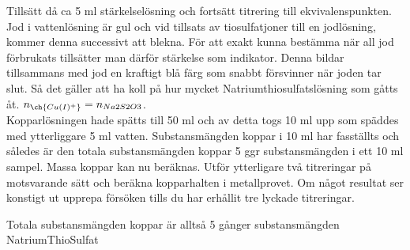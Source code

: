 \documentclass[./chem_exercises.tex]{subfiles}
\begin{document}
Tillsätt
då ca 5 ml stärkelselösning och fortsätt titrering till ekvivalenspunkten.
Jod i vattenlösning är gul och vid tillsats av tiosulfatjoner till en jodlösning, kommer denna successivt
att blekna. För att exakt kunna bestämma när all jod förbrukats tillsätter man därför stärkelse som
indikator. Denna bildar tillsammans med jod en kraftigt blå färg som snabbt försvinner när joden tar
slut. Så det gäller att ha koll på hur mycket Natriumthiosulfatslösning som gåtts åt.
$n_{\ch{Cu(I)^+}}=n_{Na2S2O3}$.\\

Kopparlösningen hade spätts till 50 ml
 och av detta togs 10 ml upp som späddes med ytterliggare 5 ml vatten.
Substansmängden koppar i 10 ml har fasställts och således är den totala substansmängden koppar
5 ggr substansmängden i ett 10 ml sampel.
Massa koppar kan nu beräknas.
Utför ytterligare två
titreringar på motsvarande sätt och beräkna kopparhalten i metallprovet. Om något resultat ser
konstigt ut upprepa försöken tills du har erhållit tre lyckade titreringar.

Totala substansmängden koppar är alltså 5 gånger substansmängden NatriumThioSulfat












\end{document}
